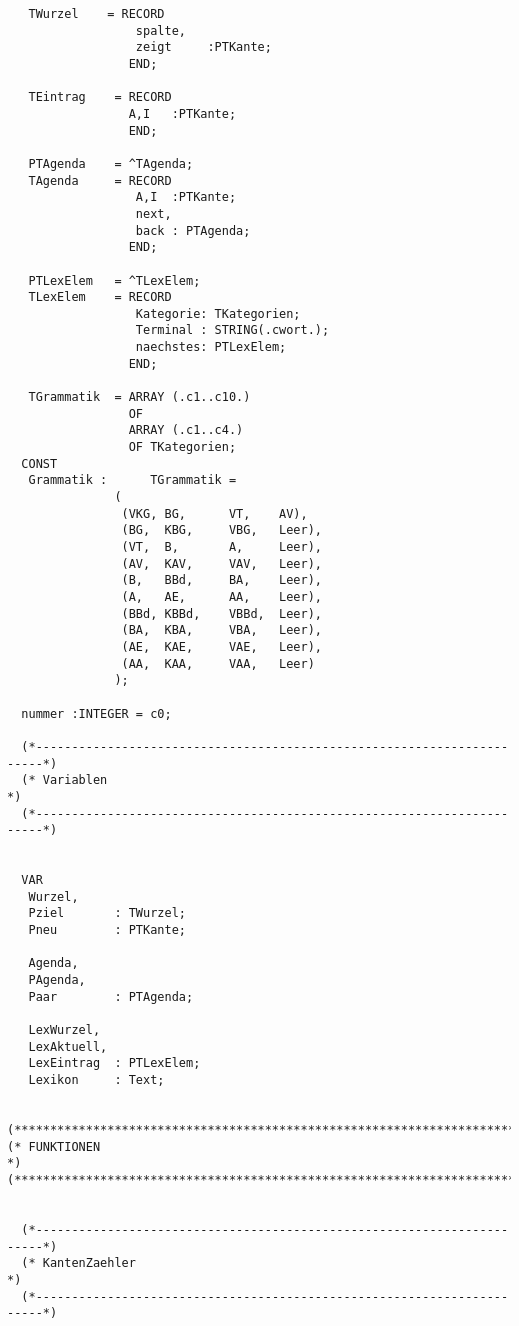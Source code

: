 \documentclass[12pt]{article}
\begin{document}
\begin{verbatim}
   TWurzel    = RECORD
                  spalte,
                  zeigt     :PTKante;
                 END;

   TEintrag    = RECORD
                 A,I   :PTKante;
                 END;

   PTAgenda    = ^TAgenda;
   TAgenda     = RECORD
                  A,I  :PTKante;
                  next,
                  back : PTAgenda;
                 END;

   PTLexElem   = ^TLexElem;
   TLexElem    = RECORD
                  Kategorie: TKategorien;
                  Terminal : STRING(.cwort.);
                  naechstes: PTLexElem;
                 END;

   TGrammatik  = ARRAY (.c1..c10.)
                 OF
                 ARRAY (.c1..c4.)
                 OF TKategorien;
  CONST
   Grammatik :      TGrammatik =
               (
                (VKG, BG,      VT,    AV),
                (BG,  KBG,     VBG,   Leer),
                (VT,  B,       A,     Leer),
                (AV,  KAV,     VAV,   Leer),
                (B,   BBd,     BA,    Leer),
                (A,   AE,      AA,    Leer),
                (BBd, KBBd,    VBBd,  Leer),
                (BA,  KBA,     VBA,   Leer),
                (AE,  KAE,     VAE,   Leer),
                (AA,  KAA,     VAA,   Leer)
               );

  nummer :INTEGER = c0;

  (*-----------------------------------------------------------------------*)
  (* Variablen                                                             *)
  (*-----------------------------------------------------------------------*)


  VAR
   Wurzel,
   Pziel       : TWurzel;
   Pneu        : PTKante;

   Agenda,
   PAgenda,
   Paar        : PTAgenda;

   LexWurzel,
   LexAktuell,
   LexEintrag  : PTLexElem;
   Lexikon     : Text;


(***************************************************************************)
(* FUNKTIONEN                                                              *)
(***************************************************************************)


  (*-----------------------------------------------------------------------*)
  (* KantenZaehler                                                         *)
  (*-----------------------------------------------------------------------*)


\end{verbatim}
\end{document}
